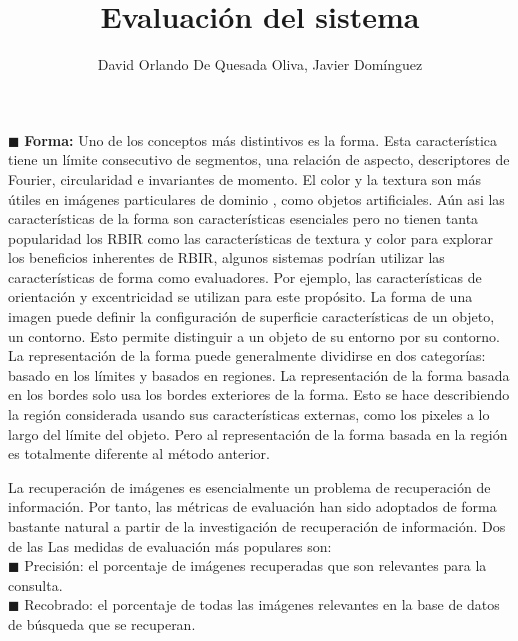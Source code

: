 \documentclass{llncs}
\begin{document}
$\blacksquare$  \textbf{Forma:}
Uno de los conceptos m\'as distintivos es la forma. Esta caracter\'istica tiene un l\'imite consecutivo de segmentos, una relaci\'on 
de aspecto, descriptores de Fourier, circularidad e invariantes de momento. El color y la textura son m\'as \'utiles en im\'agenes 
particulares de dominio , como objetos artificiales. A\'un asi las caracter\'isticas de la forma son caracter\'isticas esenciales 
pero no tienen tanta popularidad los RBIR como las caracter\'isticas de textura y color para explorar los beneficios inherentes de RBIR,
algunos sistemas podrían utilizar las características de forma como evaluadores. Por ejemplo, las características de orientación 
y excentricidad se utilizan para este propósito. La forma de una imagen puede definir la configuraci\'on de superficie  caracter\'isticas 
de un objeto, un contorno. Esto permite distinguir a un objeto de su entorno por su contorno. La representaci\'on de la forma puede 
generalmente dividirse en dos categor\'ias: basado en los l\'imites y basados en regiones. La representaci\'on de la forma basada en los 
bordes solo usa los bordes exteriores de la forma. Esto se hace describiendo la regi\'on considerada usando sus caracter\'isticas externas,
como los pixeles a lo largo del l\'imite del objeto. Pero al representaci\'on de la forma basada en la regi\'on es totalmente diferente 
al m\'etodo anterior. 














\newpage

\title{Evaluación del sistema}
\author{David Orlando De Quesada Oliva, Javier Dom\'inguez}
\maketitle

La recuperación de imágenes es esencialmente un problema de recuperación de información. Por tanto, 
las métricas de evaluación han sido adoptados de forma bastante natural a partir de la investigación de 
recuperación de información. Dos de las Las medidas de evaluación más populares son:\\
$\blacksquare$ Precisión: el porcentaje de imágenes recuperadas que son relevantes para la consulta.\\
$\blacksquare$ Recobrado: el porcentaje de todas las imágenes relevantes en la base de datos de búsqueda que se recuperan.\\
\end{document}
